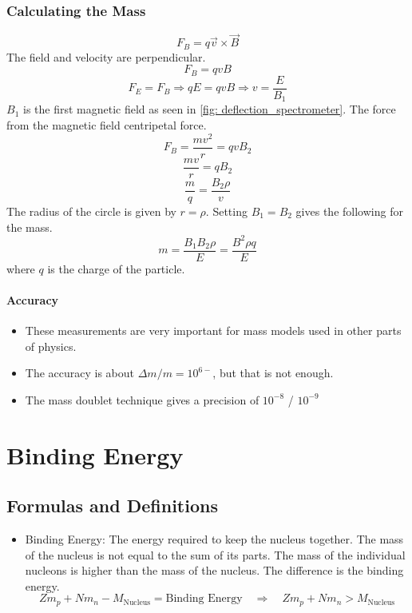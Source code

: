 \documentclass{article}
\begin{document}
\subsubsection{Calculating the Mass}
\begin{equation}
F_{B} = q \vec{v} × \vec{B} 
\end{equation}
The field and velocity are perpendicular.
\begin{equation}
F_{B} = qvB
\end{equation}
\begin{equation}
F_E = F_B ⇒ qE = qvB ⇒ v = \frac{E}{B_1}
\end{equation}
$B_1$ is the first magnetic field as seen in \cref{fig: deflection_spectrometer}. The force from the magnetic field centripetal force. 
\begin{equation}
F_B = \frac{mv^2}{r} = qvB_2
\end{equation}
\begin{equation}
\frac{mv}{r} = qB_2
\end{equation}
\begin{equation}  
\frac{m}{q} = \frac{B_2ρ}{v}
\end{equation}
The radius of the circle is given by $r = ρ$. Setting $B_1 = B_2$ gives the following for the mass.
\begin{equation}
m = \frac{B_1 B_2 ρ}{E} = \frac{B^2 ρq}{E}
\end{equation}
where $q$ is the charge of the particle.

\paragraph{Accuracy}
\begin{itemize}
    \item These measurements are very important for mass models used in other parts of physics. 
    \item The accuracy is about $Δm / m = 10^{6-}$, but that is not enough. 
    \item The mass doublet technique gives a precision of $10^{-8}$ / $10^{-9}$
\end{itemize}






\section{Binding Energy}
\subsection{Formulas and Definitions}
\begin{itemize}
    \item Binding Energy: The energy required to keep the nucleus together. The mass of the nucleus is not equal to the sum of its parts. The mass of the individual nucleons is higher than the mass of the nucleus. The difference is the binding energy.
    \begin{equation}
    Zm_p + Nm_n - M_{\text{Nucleus}} = \text{Binding Energy}  \quad ⇒ \quad Zm_p + Nm_n > M_{\text{Nucleus}}
    \end{equation}
\end{itemize}
\end{document}
